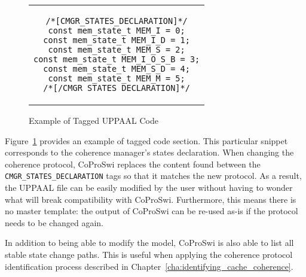 \begin{figure}[hbt!]
\begin{center}
\begin{tabular}{c}
\begin{lstlisting}
/*[CMGR_STATES_DECLARATION]*/
const mem_state_t MEM_I = 0;
const mem_state_t MEM_I_D = 1;
const mem_state_t MEM_S = 2;
const mem_state_t MEM_I_O_S_B = 3;
const mem_state_t MEM_S_D = 4;
const mem_state_t MEM_M = 5;
/*[/CMGR_STATES_DECLARATION]*/
\end{lstlisting}
\end{tabular}
\end{center}
\caption{Example of Tagged UPPAAL Code}
\label{fig:UPPAAL:tag_example}
\end{figure}

Figure~\ref{fig:UPPAAL:tag_example} provides an example of tagged code section.
This particular snippet corresponds to the coherence manager's states
declaration.  When changing the coherence protocol, CoProSwi replaces the
content found between the \lstinline!CMGR_STATES_DECLARATION! tags so that it
matches the new protocol.  As a result, the UPPAAL file can be easily modified
by the user without having to wonder what will break compatibility with
CoProSwi. Furthermore, this means there is no master template: the output of
CoProSwi can be re-used as-is if the protocol needs to be changed again.

In addition to being able to modify the model, CoProSwi is also able to list
all stable state change paths. This is useful when applying the coherence
protocol identification process described in
Chapter~\ref{cha:identifying_cache_coherence}.
